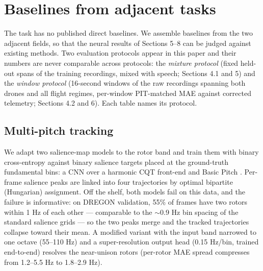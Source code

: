 \documentclass[journal]{IEEEtran}
\begin{document}
\section{Baselines from adjacent tasks}
\label{sec:baselines}

The task has no published direct baselines. We assemble baselines from the
two adjacent fields, so that the neural results of Sections 5--8 can be
judged against existing methods. Two evaluation protocols appear in this
paper and their numbers are never comparable across protocols: the
\emph{mixture protocol} (fixed held-out spans of the training recordings,
mixed with speech; Sections 4.1 and 5) and the \emph{window protocol}
(16-second windows of the raw recordings spanning both drones and all flight
regimes, per-window PIT-matched MAE against corrected telemetry;
Sections 4.2 and 6). Each table names its protocol.

\subsection{Multi-pitch tracking}
\label{sec:multipitch}

We adapt two salience-map models to the rotor band and train them with
binary cross-entropy against binary salience targets placed at the
ground-truth fundamental bins: a CNN over a harmonic CQT front-end
\cite{cuesta2020multif0} and Basic Pitch \cite{bittner2022basicpitch}.
Per-frame salience peaks are linked into four trajectories by optimal
bipartite (Hungarian) assignment. Off the shelf, both models fail on this
data, and the failure is informative: on DREGON validation, 55\% of frames
have two rotors within 1 Hz of each other --- comparable to the $\sim$0.9 Hz
bin spacing of the standard salience grids --- so the two peaks merge and the
tracked trajectories collapse toward their mean. A modified variant with the
input band narrowed to one octave (55--110 Hz) and a super-resolution output
head (0.15 Hz/bin, trained end-to-end) resolves the near-unison rotors
(per-rotor MAE spread compresses from 1.2--5.5 Hz to 1.8--2.9 Hz).
\end{document}
